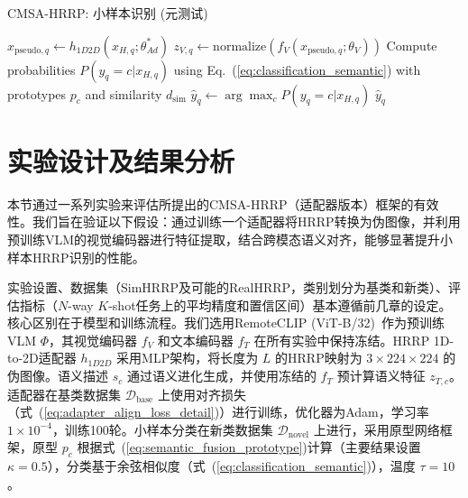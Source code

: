 \begin{algorithm}[h]
\caption{CMSA-HRRP: 小样本识别 (元测试)}
\label{alg:fsl_testing_adapter}
$x_{\text{pseudo},q} \leftarrow h_{1D2D}(x_{H,q}; \theta_{Ad}^*)$\;
$z_{V,q} \leftarrow \text{normalize}(f_V(x_{\text{pseudo},q}; \theta_V))$\;
Compute probabilities $P(y_q = c | x_{H,q})$ using Eq.~(\ref{eq:classification_semantic}) with prototypes $p_c$ and similarity $d_{\text{sim}}$\;
$\hat{y}_q \leftarrow \arg\max_c P(y_q = c | x_{H,q})$\;
\Return $\hat{y}_q$
\end{algorithm}

\section{实验设计及结果分析}
\label{sec:experiments_semantic}

本节通过一系列实验来评估所提出的CMSA-HRRP（适配器版本）框架的有效性。我们旨在验证以下假设：通过训练一个适配器将HRRP转换为伪图像，并利用预训练VLM的视觉编码器进行特征提取，结合跨模态语义对齐，能够显著提升小样本HRRP识别的性能。

实验设置、数据集（SimHRRP及可能的RealHRRP，类别划分为基类和新类）、评估指标（$N$-way $K$-shot任务上的平均精度和置信区间）基本遵循前几章的设定。核心区别在于模型和训练流程。我们选用RemoteCLIP (ViT-B/32)~\cite{RemoteCLIP}作为预训练VLM $\Phi$，其视觉编码器 $f_V$ 和文本编码器 $f_T$ 在所有实验中保持冻结。HRRP 1D-to-2D适配器 $h_{1D2D}$ 采用MLP架构，将长度为 $L$ 的HRRP映射为 $3 \times 224 \times 224$ 的伪图像。语义描述 $s_c$ 通过语义进化生成，并使用冻结的 $f_T$ 预计算语义特征 $z_{T,c}$。适配器在基类数据集 $\mathcal{D}_{\text{base}}$ 上使用对齐损失（式~(\ref{eq:adapter_align_loss_detail})）进行训练，优化器为Adam，学习率 $1 \times 10^{-4}$，训练100轮。小样本分类在新类数据集 $\mathcal{D}_{\text{novel}}$ 上进行，采用原型网络框架，原型 $p_c$ 根据式~(\ref{eq:semantic_fusion_prototype})计算（主要结果设置 $\kappa=0.5$），分类基于余弦相似度（式~(\ref{eq:classification_semantic})），温度 $\tau=10$。

